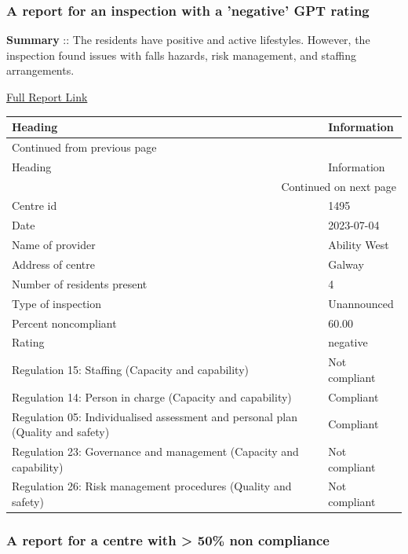 \documentclass[a4paper,11pt,twoside]{article}
\begin{document}
\subsubsection{A report for an inspection with a 'negative' GPT rating}
\label{sec:org14fd64d}

\textbf{Summary} :: The residents have positive and active lifestyles. However, the inspection found issues with falls hazards, risk management, and staffing arrangements.

\href{https://www.hiqa.ie/system/files?file=inspectionreports/1495-ocean-wave-services-04-july-2023.pdf}{Full Report Link}


\begin{longtable}{p{11cm}|p{5cm}}
Heading & Information\\[0pt]
\hline
\endfirsthead
\multicolumn{2}{l}{Continued from previous page} \\[0pt]
\hline

Heading & Information \\[0pt]

\hline
\endhead
\hline\multicolumn{2}{r}{Continued on next page} \\
\endfoot
\endlastfoot
\hline
Centre id & 1495\\[0pt]
Date & 2023-07-04\\[0pt]
Name of provider & Ability West\\[0pt]
Address of centre & Galway\\[0pt]
Number of residents present & 4\\[0pt]
Type of inspection & Unannounced\\[0pt]
Percent noncompliant & 60.00\\[0pt]
Rating & negative\\[0pt]
Regulation 15: Staffing (Capacity and capability) & Not compliant\\[0pt]
Regulation 14: Person in charge (Capacity and capability) & Compliant\\[0pt]
Regulation 05: Individualised assessment and personal plan (Quality and safety) & Compliant\\[0pt]
Regulation 23: Governance and management (Capacity and capability) & Not compliant\\[0pt]
Regulation 26: Risk management procedures (Quality and safety) & Not compliant\\[0pt]
\end{longtable}
\subsubsection{A report for a centre with > 50\% non compliance}
\label{sec:org2de7d83}
\end{document}
